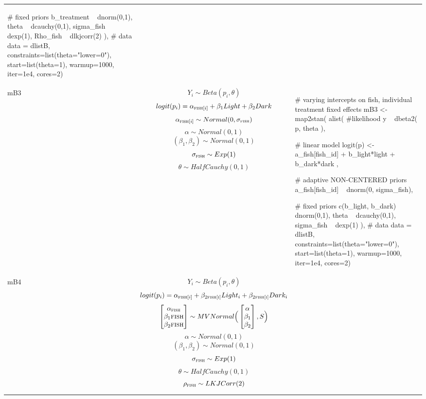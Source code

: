 \begin{longtable}{p{} |p{} |p{} }
{\begin{mylist}
    # fixed priors
    b_treatment ~ dnorm(0,1),
    theta ~ dcauchy(0,1),
    sigma_fish ~ dexp(1),
    Rho_fish ~ dlkjcorr(2)
  ),
  # data
  data = dlistB,
  constraints=list(theta="lower=0"),
  start=list(theta=1), warmup=1000, iter=1e4, cores=2) \end{mylist}}
\\ %
mB3 & %
$$ Y_i \sim Beta(p_i, \theta) $$
\small $$ logit(p_i) =  \alpha_{\textsc{fish}[i]} + \beta_1{Light} + \beta_2{Dark}$$
$$\alpha_{\textsc{fish}[i]} \sim Normal(0, \sigma_{\textsc{fish}}) $$
$$ \alpha  \sim Normal(0,1) $$
$$ (\beta_1, \beta_2)  \sim Normal(0,1) $$
$$ \sigma_{\textsc{fish}} \sim Exp(1) $$
$$ \theta \sim HalfCauchy(0, 1) $$
&
{\begin{mylist} %
#  varying intercepts on fish, individual treatment fixed effects
mB3 <- map2stan(
  alist(
    #likelihood
    y ~ dbeta2( p, theta ),
    
    # linear model
    logit(p) <- a_fish[fish_id] + b_light*light + 
    b_dark*dark ,
    
    # adaptive NON-CENTERED priors 
    a_fish[fish_id] ~ dnorm(0, sigma_fish),
    
    # fixed priors
    c(b_light, b_dark) ~ dnorm(0,1),
    theta ~ dcauchy(0,1),
    sigma_fish ~ dexp(1)
  ),
  # data
  data = dlistB,
  constraints=list(theta="lower=0"),
  start=list(theta=1), warmup=1000, iter=1e4, cores=2) \end{mylist}}
\\ %
mB4& %
$$ Y_i \sim Beta(p_i, \theta) $$
\small $$ logit(p_i) =  \alpha_{\textsc{fish}[i]} + \beta_{\textsc{2fish[i]}}Light_i + \beta_{\textsc{2fish[i]}}Dark_i$$
$$
\begin{bmatrix}
\alpha_{\textsc{fish}} \\
\beta_1{\textsc{fish}} \\
\beta_2{\textsc{fish}} \\
\end{bmatrix} \sim MVNormal \Big(
\begin{bmatrix}
\alpha \\
\beta_1 \\
\beta_2 \\
\end{bmatrix}, S \Big)
$$
$$ \alpha  \sim Normal(0,1) $$
$$ (\beta_1, \beta_2)  \sim Normal(0,1) $$
$$ \sigma_{\textsc{fish}} \sim Exp(1) $$
$$ \theta \sim HalfCauchy(0, 1) $$
$$ \rho_{\textsc{fish}} \sim LKJCorr(2) $$
&
{\begin{mylist} %


\end{mylist}}
\end{longtable}
